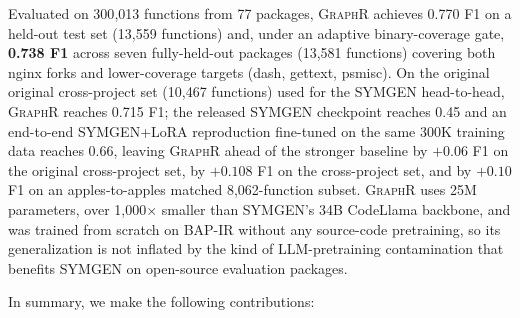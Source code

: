 \documentclass[sigconf,nonacm]{acmart}
\newcommand{\sysname}{\textsc{GraphR}}
\begin{document}
Evaluated on 300{,}013 functions from 77 packages, \sysname{} achieves 0.770 F1 on a held-out test set (13{,}559 functions) and, under an adaptive binary-coverage gate, \textbf{0.738 F1} across seven fully-held-out packages (13{,}581 functions) covering both nginx forks and lower-coverage targets (dash, gettext, psmisc). On the original original cross-project set (10{,}467 functions) used for the SYMGEN head-to-head, \sysname{} reaches 0.715 F1; the released SYMGEN checkpoint reaches 0.45 and an end-to-end SYMGEN+LoRA reproduction fine-tuned on the same 300K training data reaches 0.66, leaving \sysname{} ahead of the stronger baseline by $+0.06$ F1 on the original cross-project set, by $+0.108$ F1 on the cross-project set, and by $+0.10$ F1 on an apples-to-apples matched 8{,}062-function subset. \sysname{} uses 25M parameters, over 1{,}000$\times$ smaller than SYMGEN's 34B CodeLlama backbone, and was trained from scratch on BAP-IR without any source-code pretraining, so its generalization is not inflated by the kind of LLM-pretraining contamination that benefits SYMGEN on open-source evaluation packages.

In summary, we make the following contributions:
\end{document}
